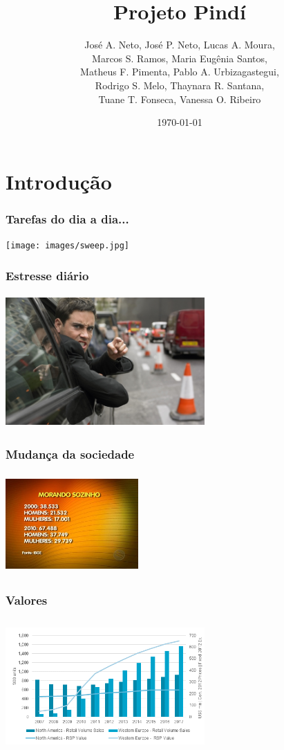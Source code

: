 \documentclass{beamer}
\title{Projeto Pindí}
\author{José A. Neto, José P. Neto, Lucas A. Moura, \\
        Marcos S. Ramos, Maria Eugênia Santos,\\
        Matheus F. Pimenta, Pablo A. Urbizagastegui,\\
        Rodrigo S. Melo, Thaynara R. Santana, \\
        Tuane T. Fonseca, Vanessa O. Ribeiro}
\date{\today}
\institute{\textbf{Universidade de Brasília - Faculdade do Gama}}
\begin{document}
\begin{frame}
  \titlepage
\end{frame}
  
\section{Introdução}
\begin{frame}
  \frametitle{Tarefas do dia a dia...}
  \begin{center}
    \texttt{[image: images/sweep.jpg]}
  \end{center}
\end{frame}

\begin{frame}
  \frametitle{Estresse diário}
  \begin{center}
    \includegraphics[height = 2in, width = 3in]{images/rage.jpeg}
  \end{center}
\end{frame}

\begin{frame}
  \frametitle{Mudança da sociedade}
  \begin{center}
    \includegraphics[height = 1.5in, width = 2in]{images/sozinho.jpg}
  \end{center}
\end{frame}

\begin{frame}
 \frametitle{Valores}
 \begin{center}
    \includegraphics[height = 2in, width = 3in]{images/market.png}
  \end{center}
\end{frame}
\end{document}
